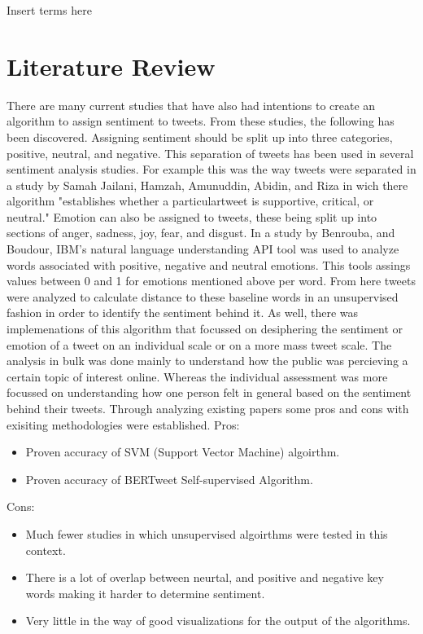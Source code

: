 \documentclass[conference]{IEEEtran}
\begin{document}
\begin{IEEEkeywords}
Insert terms here
\end{IEEEkeywords}

\section{Literature Review}
There are many current studies that have also had intentions to create an algorithm to assign sentiment to tweets.  
From these studies, the following has been discovered.
Assigning sentiment should be split up into three categories, positive, neutral, and negative.
This separation of tweets has been used in several sentiment analysis studies.
For example this was the way tweets were separated in a study by Samah Jailani, Hamzah, Amunuddin, Abidin, and Riza in wich there algorithm "establishes whether a particulartweet is supportive, critical, or neutral\cite{b2}."
Emotion can also be assigned to tweets, these being split up into sections of anger, sadness, joy, fear, and disgust. 
In a study by Benrouba, and Boudour, IBM's natural language understanding API tool was used to analyze words associated with positive, negative and neutral emotions\cite{b1}.
This tools assings values between 0 and 1 for emotions mentioned above per word. 
From here tweets were analyzed to calculate distance to these baseline words in an unsupervised fashion in order to identify the sentiment behind it. 
As well, there was implemenations of this algorithm that focussed on desiphering the sentiment or emotion of a tweet on an individual scale or on a more mass tweet scale.
The analysis in bulk was done mainly to understand how the public was percieving a certain topic of interest online. 
Whereas the individual assessment was more focussed on understanding how one person felt in general based on the sentiment behind their tweets. 
Through analyzing existing papers some pros and cons with exisiting methodologies were established. \newline
\newline
Pros: 
\begin{itemize}
    \item Proven accuracy of SVM (Support Vector Machine) algoirthm.
    \item Proven accuracy of BERTweet Self-supervised Algorithm.
\end{itemize}
Cons:
\begin{itemize}
    \item Much fewer studies in which unsupervised algoirthms were tested in this context.
    \item There is a lot of overlap between neurtal, and positive and negative key words making it harder to determine sentiment.
    \item Very little in the way of good visualizations for the output of the algorithms.
\end{itemize}
\end{document}
